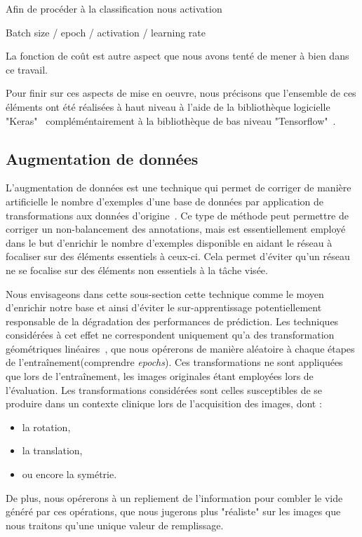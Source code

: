 Afin de procéder à la classification nous activation

Batch size / epoch / activation / learning rate

La fonction de coût est autre aspect que nous avons tenté de mener à bien dans ce travail.
~\cite{Park2019}
~\cite{Barbu2018}

Pour finir sur ces aspects de mise en oeuvre, nous précisons que l'ensemble de ces éléments ont été réalisées à haut niveau à l'aide de la bibliothèque logicielle "Keras"~\cite{chollet2015} compléméntairement à la bibliothèque de bas niveau "Tensorflow"~\cite{tensorflow2015}.\par

\subsection{Augmentation de données}
L'augmentation de données est une technique qui permet de corriger de manière artificielle le nombre d'exemples d'une base de données par application de transformations aux données d'origine~\cite{Wong2016,Taylor2018}. Ce type de méthode peut permettre de corriger un non-balancement des annotations, mais est essentiellement employé dans le but d'enrichir le nombre d'exemples disponible en aidant le réseau à focaliser sur des éléments essentiels à ceux-ci. Cela permet d'éviter qu'un réseau ne se focalise sur des éléments non essentiels à la tâche visée.\par

Nous envisageons dans cette sous-section cette technique comme le moyen d'enrichir notre base et ainsi d'éviter le sur-apprentissage potentiellement responsable de la dégradation des performances de prédiction. Les techniques considérées à cet effet ne correspondent uniquement qu'a des transformation géométriques linéaires~\cite{Taylor2018}, que nous opérerons de manière aléatoire à chaque étapes de l'entraînement(comprendre \textit{epochs}). Ces transformations ne sont appliquées que lors de l'entraînement, les images originales étant employées lors de l'évaluation. Les transformations considérées sont celles susceptibles de se produire dans un contexte clinique lors de l'acquisition des images, dont :
\begin{itemize}
    \item la rotation,
    \item la translation,
    \item ou encore la symétrie.
\end{itemize} De plus, nous opérerons à un repliement de l'information pour combler le vide généré par ces opérations, que nous jugerons plus "réaliste" sur les images que nous traitons qu'une unique valeur de remplissage.\par

